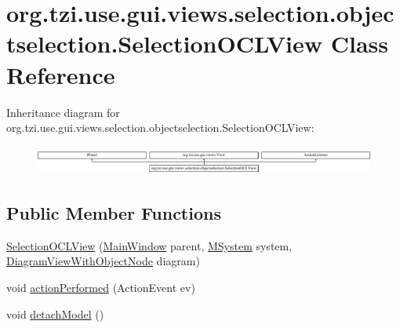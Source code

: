 \hypertarget{classorg_1_1tzi_1_1use_1_1gui_1_1views_1_1selection_1_1objectselection_1_1_selection_o_c_l_view}{\section{org.\-tzi.\-use.\-gui.\-views.\-selection.\-objectselection.\-Selection\-O\-C\-L\-View Class Reference}
\label{classorg_1_1tzi_1_1use_1_1gui_1_1views_1_1selection_1_1objectselection_1_1_selection_o_c_l_view}
}
Inheritance diagram for org.\-tzi.\-use.\-gui.\-views.\-selection.\-objectselection.\-Selection\-O\-C\-L\-View\-:\begin{figure}[H]
\begin{center}
\leavevmode
\includegraphics[height=0.962199cm]{classorg_1_1tzi_1_1use_1_1gui_1_1views_1_1selection_1_1objectselection_1_1_selection_o_c_l_view}
\end{center}
\end{figure}
\subsection*{Public Member Functions}
\begin{DoxyCompactItemize}
\item 
\hyperlink{classorg_1_1tzi_1_1use_1_1gui_1_1views_1_1selection_1_1objectselection_1_1_selection_o_c_l_view_aff33e46f25d478b8c83f132650ee422f}{Selection\-O\-C\-L\-View} (\hyperlink{classorg_1_1tzi_1_1use_1_1gui_1_1main_1_1_main_window}{Main\-Window} parent, \hyperlink{classorg_1_1tzi_1_1use_1_1uml_1_1sys_1_1_m_system}{M\-System} system, \hyperlink{classorg_1_1tzi_1_1use_1_1gui_1_1views_1_1diagrams_1_1_diagram_view_with_object_node}{Diagram\-View\-With\-Object\-Node} diagram)
\item 
void \hyperlink{classorg_1_1tzi_1_1use_1_1gui_1_1views_1_1selection_1_1objectselection_1_1_selection_o_c_l_view_a8f44141fe93db65bc58ebb020a36fe10}{action\-Performed} (Action\-Event ev)
\item 
void \hyperlink{classorg_1_1tzi_1_1use_1_1gui_1_1views_1_1selection_1_1objectselection_1_1_selection_o_c_l_view_acc2d72c21d0bc8d3a796c31bd0790043}{detach\-Model} ()
\end{DoxyCompactItemize}

